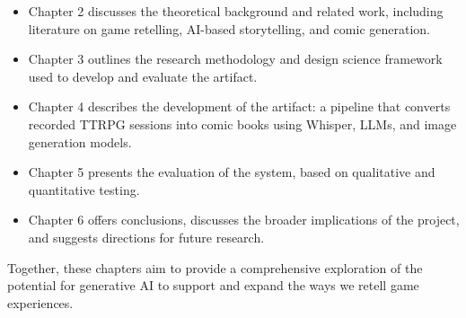 \begin{itemize}
    \item Chapter 2 discusses the theoretical background and related work, including literature on game retelling, AI-based storytelling, and comic generation.
    \item Chapter 3 outlines the research methodology and design science framework used to develop and evaluate the artifact.
    \item Chapter 4 describes the development of the artifact: a pipeline that converts recorded TTRPG sessions into comic books using Whisper, LLMs, and image generation models.
    \item Chapter 5 presents the evaluation of the system, based on qualitative and quantitative testing.
    \item Chapter 6 offers conclusions, discusses the broader implications of the project, and suggests directions for future research.
\end{itemize}

Together, these chapters aim to provide a comprehensive exploration of the potential for generative AI to support and expand the ways we retell game experiences.

